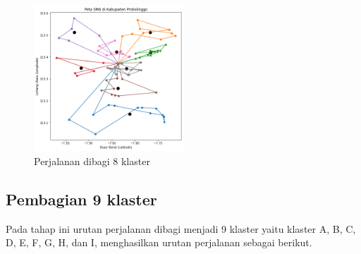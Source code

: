 \begin{figure}[H]
\centering
\includegraphics[width=0.5\textwidth]{Gambar/hasil_mtsp/8}
\caption{Perjalanan dibagi 8 klaster}
\label{fig:hasil_mtsp8}
\end{figure}

\subsection{Pembagian 9 klaster}

Pada tahap ini urutan perjalanan dibagi menjadi 9 klaster yaitu klaster A, B, C, D, E, F, G, H, dan I, menghasilkan urutan perjalanan sebagai berikut.

